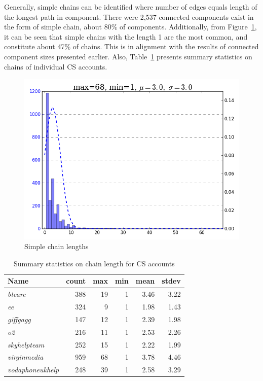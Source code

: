 \documentclass[sigconf]{acmart}
\begin{document}
Generally, simple chains can be identified where number of edges
equals length of the longest path in component. There were 2,537
connected components exist in the form of simple chain, about 80\% of
components. Additionally, from Figure~\ref{fig:simplechainlengths}, it
can be seen that simple chains with the length 1 are the most common,
and constitute about 47\% of chains. This is in alignment with the
results of connected component sizes presented earlier. Also,
Table~\ref{tbl:delaystatscl} presents summary statistics on chains of
individual CS accounts.

\begin{figure}[htb]
\centering
\includegraphics[width=\columnwidth]{images/simplechainlengths.png}
\caption{Simple chain lengths}
\label{fig:simplechainlengths}
\end{figure}

\begin{table}[!h]
\centering
\begin{tabularx}{\columnwidth}{lrrrrr}
\toprule
\textbf{Name} & \textbf{count} & \textbf{max} & \textbf{min} & \textbf{mean} & \textbf{stdev}\\ 
\midrule
{\emph{btcare}} & 388 & 19 & 1 & 3.46 & 3.22\\
{\emph{ee}} & 324 & 9 & 1 & 1.98 & 1.43\\
{\emph{giffgagg}} & 147 & 12 & 1 & 2.39 & 1.98\\ 
{\emph{o2}} & 216 & 11 & 1 & 2.53 & 2.26\\
{\emph{skyhelpteam}} & 252 & 15 & 1 & 2.22 & 1.99\\
{\emph{virginmedia}} & 959 & 68 & 1 & 3.78 & 4.46\\
{\emph{vodaphoneukhelp}} & 248 & 39 & 1 & 2.58 & 3.29\\
\bottomrule
\end{tabularx}
\caption{Summary statistics on chain length for CS accounts}
\label{tbl:delaystatscl}
\end{table}
\end{document}

